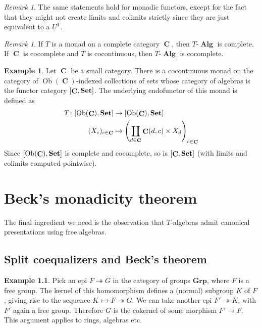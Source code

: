 \documentclass[a4paper,11pt,fullpage,oneside,openany]{amsbook}
\newcommand{\catname}[1]{{\normalfont\textbf{#1}}}
\DeclareMathOperator{\Alg}{\mathbf{Alg}}
\newcommand{\Set}{\catname{Set}}
\DeclareMathOperator{\C}{\mathbf{C}}
\DeclareMathOperator{\Ob}{Ob}
\theoremstyle{definition}
\theoremstyle{definition}
\newtheorem{exmp}[thm]{Example} %
\theoremstyle{remark}
\newtheorem{rmk}[thm]{Remark}
\begin{document}
\begin{rmk}
	The same statements hold for monadic functors, except for the fact that they might not create limits and colimits strictly since they are just equivalent to a $U^T$.
\end{rmk}

\begin{rmk}
	If $T$ is a monad on a complete category $\C$, then $T\mbox{-}\Alg$ is complete. If $\C$ is cocomplete and $T$ is cocontinuous, then $T\mbox{-}\Alg$ is cocomplete.
\end{rmk}

\begin{exmp}
	Let $\C$ be a small category. There is a cocontinuous monad on the category of $\Ob(\C)$-indexed collections of sets whose category of algebras is the functor category $[\C,\Set]$. The underlying endofunctor of this monad is defined as 
	\begin{align*}
	T\colon[\Ob(\C),\Set]&\to[\Ob(\C),\Set] \\
	(X_c)_{c\in\C}&\mapsto \left(\coprod_{d\in\C}\C(d,c)\times X_d\right)_{c\in\C}
	\end{align*}
	Since $[\Ob(\C),\Set]$ is complete and cocomplete, so is $[\C,\Set]$ (with limits and colimits computed pointwise).
\end{exmp}
 
	\chapter{Beck’s monadicity theorem}
	The final ingredient we need is the observation that $T$-algebras admit canonical presentations using free algebras.
\section{Split coequalizers and Beck's theorem}
\begin{exmp}
	Pick an epi $F\twoheadrightarrow G$ in the category of groups $\mathbf{Grp}$, where $F$ is a free group. The kernel of this homomorphism defines a (normal) subgroup $K$ of $F$, giving rise to the sequence $K\rightarrowtail F\twoheadrightarrow G$. We can take another epi $F'\twoheadrightarrow K$, with $F'$ again a free group. Therefore $G$ is the cokernel of some morphism $F'\to F$. This argument applies to rings, algebras etc.
\end{exmp}
\end{document}
